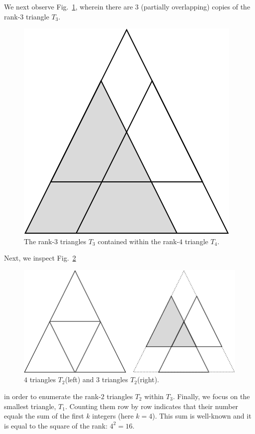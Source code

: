 \begin{itemize}
\begin{enumerate}
We next observe Fig.~\ref{fig:countingTriangles3}, wherein there are $3$ (partially overlapping) copies of the rank-$3$ triangle $T_3$.
\begin{figure}[h]
\begin{center}
        \includegraphics[scale=0.25]{FiguresArithmetic/CountingTriangles3} 
        \caption{The rank-$3$ triangles $T_3$ contained within the rank-$4$ triangle $T_4$.}
        \label{fig:countingTriangles3}
\end{center}
\end{figure}
Next, we inspect Fig.~\ref{fig:countingTriangles2}
\begin{figure}[h]
\begin{center}
        \includegraphics[scale=0.25]{FiguresArithmetic/CountingTriangles2} 
        \caption{$4$ triangles $T_2$(left) and $3$ triangles $T_2$(right).}
        \label{fig:countingTriangles2}
\end{center}
\end{figure}
in order to enumerate the rank-$2$ triangles $T_2$ within $T_3$.  Finally, we focus on the smallest triangle, $T_1$.  Counting them row by row indicates that their number equals the sum of the first $k$ integers (here $k=4$).
This sum is well-known and it is equal to the square of the rank: $4^2 = 16$.


\end{enumerate}
\end{itemize}
